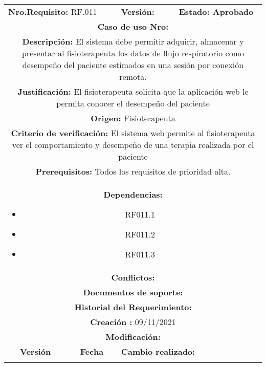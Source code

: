 \begin{center}
\begin{tabular}{|c|c|p{4cm}|p{4cm}|}
            \hline
            \rowcolor{red} \multicolumn{4}{|c|}{\textbf{Prioridad:} Alta}  \\
            \hline
            \multicolumn{2}{|l}{\textbf{Nro.Requisito: }RF.011} & \multicolumn{1}{|l}{\textbf{Versión: }} & \multicolumn{1}{|l|}{\textbf{Estado: Aprobado}} \\
            \multicolumn{4}{|p{13cm}|}{\textbf{Caso de uso Nro: }}  \\
            \hline
            \multicolumn{4}{|p{13cm}|}{\textbf{Descripción: } El sistema debe permitir adquirir, almacenar y presentar al fisioterapeuta los datos de flujo respiratorio como desempeño del paciente estimados en una sesión por conexión remota. } \\
            \multicolumn{4}{|p{13cm}|}{\textbf{Justificación: } El fisioterapeuta solicita que la aplicación web le permita conocer el desempeño del paciente} \\ 
            \multicolumn{4}{|p{13cm}|}{\textbf{Origen: }Fisioterapeuta}  \\
            \multicolumn{4}{|p{13cm}|}{\textbf{Criterio de verificación: } El sistema web permite al fisioterapeuta ver el comportamiento y desempeño de una terapia realizada por el paciente} \\
            \hline
            \multicolumn{4}{|p{13cm}|}{\textbf{Prerequisitos: } Todos los requisitos de prioridad alta. }\\
            \hline \multicolumn{4}{|p{12cm}|}{\textbf{Dependencias: }
               \begin{itemize}
                   \item RF011.1
                   \item RF011.2
                   \item RF011.3
               \end{itemize}
              }  \\
            \multicolumn{4}{|p{12cm}|}{\textbf{Conflictos: }}  \\
            \hline
            \multicolumn{4}{|p{12cm}|}{\textbf{Documentos de soporte: }}  \\
            \hline
            \multicolumn{4}{|p{12cm}|}{\textbf{Historial del Requerimiento: }}  \\
            \multicolumn{4}{|p{12cm}|}{\textbf{Creación : }09/11/2021}  \\
            \multicolumn{4}{|p{12cm}|}{\textbf{Modificación: }}  \\
             \textbf{Versión} & \textbf{Fecha} & \multicolumn{2}{p{8cm}|}{\textbf{Cambio realizado:}} \\
            \hline
                 & &   \multicolumn{2}{p{8cm}|}{}
              \\
            \hline
\end{tabular}




\end{center}
